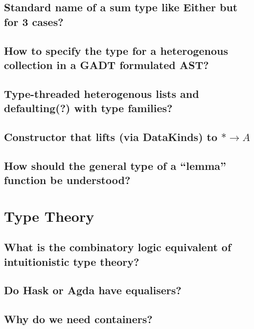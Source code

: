 \documentclass{book}%
\begin{document}
\section{Standard name of a sum type like Either but for 3 cases?}


\section{How to specify the type for a heterogenous collection in a GADT formulated AST?}


\section{Type-threaded heterogenous lists and defaulting(?) with type families?}


\section{Constructor that lifts (via DataKinds) to $\ast\to A$}


\section{How should the general type of a ``lemma'' function be understood?}



\chapter{Type Theory}

\section{What is the combinatory logic equivalent of intuitionistic type theory?}


\section{Do Hask or Agda have equalisers?}


\section{Why do we need containers?}

\end{document}
